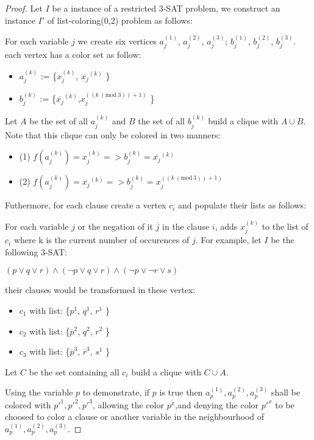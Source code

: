 \documentclass[9pt]{../document-types/entcs} \usepackage{../document-types/entcsmacro}
\newcommand{\Mod}[1]{\ (\mathrm{mod}\ #1)}
\begin{document}
\begin{proof}
Let $I$ be a instance of a restricted 3-SAT problem, we construct an instance $I'$ of list-coloring(0,2) problem as follows:

For each variable $j$ we create six vertices $a_j^{(1)}$, $a_j^{(2)}$, $a_j^{(3)}$;	$b_j^{(1)}$, $b_j^{(2)}$, $b_j^{(3)}$. each vertex has a color set as follow:
  \begin{itemize}
    \item $a_j^{(k)}$ := \{$x_j^{(k)}$, $\overline{x_j}^{(k)}$ \}
    \item $b_j^{(k)}$ := \{$\overline{x_j}^{(k)}$,$x_j^{((k \Mod{3}) + 1 )}$ \}
  \end{itemize}

Let $A$ be the set of all $a_j^{(k)}$ and $B$ the set of all $b_j^{(k)}$ build a clique with $A \cup B$.
Note that this clique can only be colored in two manners:
\begin{itemize}
	\item (1)  $f(a_j^{(k)}) = x_j^{(k)} => b_j^{(k)} = \overline{x_j}^{(k)}$
	\item (2)  $f(a_j^{(k)}) = \overline{x_j}^{(k)} => b_j^{(k)} = x_j^{((k \Mod{3}) + 1 )}$
\end{itemize}

Futhermore, for each clause create a vertex $c_i$ and populate their lists as follows:

For each variable $j$ or the negation of it $\overline{j}$ in the clause $i$, adds $x_j^{(k)}$ to the list of $c_i$ where k is the current number of occurences of $j$.
For example, let $I$ be the following 3-SAT:

$(p \lor q \lor r) \land (\neg{p} \lor q \lor r) \land (\neg{p} \lor \neg{r} \lor s)$

their clauses would be transformed in these vertex:
\begin{itemize}
	\item $c_1$ with list: \{$p^1$, $q^1$, $r^1$ \}
	\item $c_2$ with list: \{$\overline{p}^2$, $q^2$, $r^2$ \}
	\item $c_3$ with list: \{$\overline{p}^3$, $\overline{r}^3$, $s^1$ \}
\end{itemize}

		Let $C$ be the set containing all $c_i$ build a clique with $C \cup A$.

    Using the variable $p$ to demonstrate, if $p$ is {\sc true} then $a_p^{(1)},a_p^{(2)},a_p^{(3)}$ shall be colored with $p'^1,p'^2,p'^3$, allowing the color $p^x$,and denying the color $p'^x$ to be choosed to color a clause or another variable in the neighbourhood of $a_p^{(1)},a_p^{(2)},a_p^{(3)}$.


\end{proof}
\end{document}
